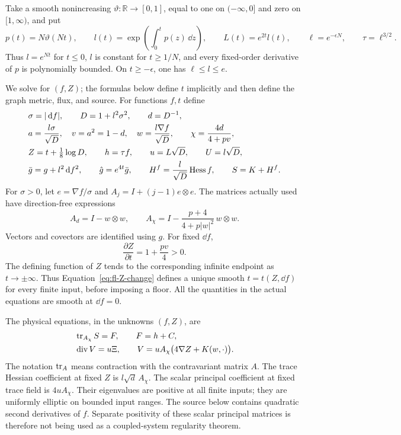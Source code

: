 Take a smooth nonincreasing \(\vartheta:\mathbb R\to[0,1]\), equal
to one on \((-\infty,0]\) and zero on \([1,\infty)\), and put
\begin{equation}
\label{eq:fl-profile}
 p(t)=N\vartheta(Nt),\qquad
 l(t)=\exp\!\left(\int_0^t p(z)\,\dd z\right),\qquad
 L(t)=e^{2t}l(t),\qquad
 \ell=e^{-\epsilon N},\qquad \tau=\ell^{3/2}.
\end{equation}
Thus \(l=e^{Nt}\) for \(t\le0\), \(l\) is constant for \(t\ge1/N\),
and every fixed-order derivative of \(p\) is polynomially bounded.
On \(t\ge-\epsilon\), one has \(\ell\le l\le e\).

We solve for \((f,Z)\); the formulas below define \(t\) implicitly and
then define the graph metric, flux, and source.
For functions \(f,t\) define
\begin{align}
\label{eq:fl-variables}
 &\sigma=\lvert\,\mathrm d f\rvert,\qquad D=1+l^2\sigma^2,\qquad
 d=D^{-1},\notag\\
 &
 a=\frac{l\sigma}{\sqrt D},\quad v=a^2=1-d,\quad
 w=\frac{l\nabla f}{\sqrt D},\qquad \chi=\frac{4d}{4+pv},\\
\label{eq:fl-Z-change}
 &Z=t+\tfrac18\log D,\qquad
 h=\tau f,\qquad u=L\sqrt D,\qquad U=l\sqrt D,\\
\label{eq:fl-graph-data}
 &\bar g=g+l^2\,\mathrm d f^2,\qquad
 \hat g=e^{4t}\bar g,\qquad
 H^f=\frac{l}{\sqrt D}\operatorname{Hess} f,\qquad S=K+H^f .
\end{align}
For \(\sigma>0\), let \(e=\nabla f/\sigma\) and
\(A_j=I+(j-1)e\otimes e\).  The matrices actually used have
direction-free expressions
\begin{equation}
\label{eq:fl-matrices}
 A_d=I-w\otimes w,\qquad
 A_\chi=I-\frac{p+4}{4+p\lvert w\rvert^2}\,w\otimes w .
\end{equation}
Vectors and covectors are identified using \(g\).
For fixed \(\dd f\),
\[
 \frac{\partial Z}{\partial t}=1+\frac{pv}{4}>0.
\]
The defining function of \(Z\) tends to the corresponding infinite
endpoint as \(t\to\pm\infty\).  Thus Equation~\eqref{eq:fl-Z-change}
defines a unique smooth \(t=t(Z,\dd f)\) for every finite input,
before imposing a floor.  All the quantities in the actual equations
are smooth at \(\dd f=0\).

The physical equations, in the unknowns \((f,Z)\), are
\begin{align}
\label{eq:fl-trace}
 &\operatorname{tr}_{A_\chi}S=F,\qquad F=h+C,\\
\label{eq:fl-scalar}
 &\operatorname{div}V=u\Xi,\qquad
 V=uA_\chi\bigl(4\nabla Z+K(w,\cdot)\bigr).
\end{align}
The notation \(\operatorname{tr}_A\) means contraction with the contravariant
matrix \(A\).  The trace Hessian coefficient at fixed \(Z\) is
\(l\sqrt d\,A_\chi\).  The scalar principal coefficient at fixed
trace field is \(4uA_\chi\).  Their eigenvalues are positive at all
finite inputs; they are uniformly elliptic on bounded input ranges.
The source below contains quadratic second derivatives of \(f\).
Separate positivity of these scalar principal matrices is therefore
not being used as a coupled-system regularity theorem.

